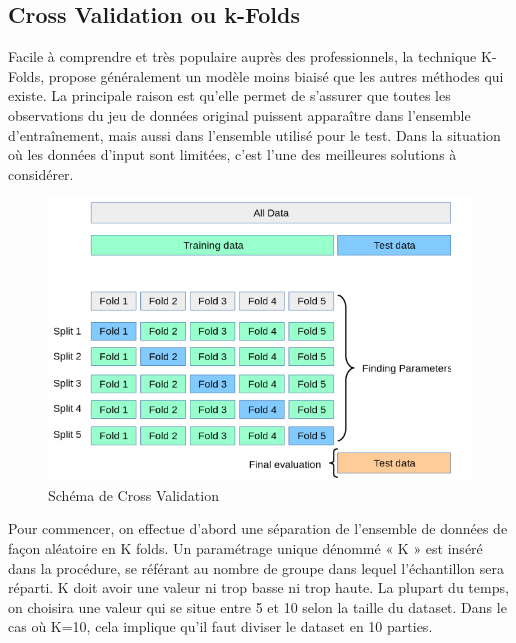 \documentclass[a4paper,12pt]{report}
\begin{document}
\subsection{Cross Validation ou k-Folds}
\noindent \normalsize Facile à comprendre et très populaire auprès des professionnels, la technique K-Folds\cite{scikit-learn}, propose généralement un modèle moins biaisé que les autres méthodes qui existe. La principale raison est qu'elle permet de s'assurer que toutes les observations du jeu de données original puissent apparaître dans l'ensemble d'entraînement, mais aussi dans l'ensemble utilisé pour le test. Dans la situation où les données d'input sont limitées, c'est l'une des meilleures solutions à considérer.
\begin{figure}[H]
\centering
 \includegraphics[scale=0.8]{outils-images/data11.png}
\caption{Schéma de Cross Validation}
\end{figure} 
\noindent \normalsize Pour commencer, on effectue d'abord une séparation de l'ensemble de données de façon aléatoire en K folds. Un paramétrage unique dénommé « K » est inséré dans la procédure, se référant au nombre de groupe dans lequel l'échantillon sera réparti. K doit avoir une valeur ni trop basse ni trop haute. La plupart du temps, on choisira une valeur qui se situe entre 5 et 10 selon la taille du dataset. Dans le cas où K=10, cela implique qu'il faut diviser le dataset en 10 parties.\\[0.2cm]
\end{document}
